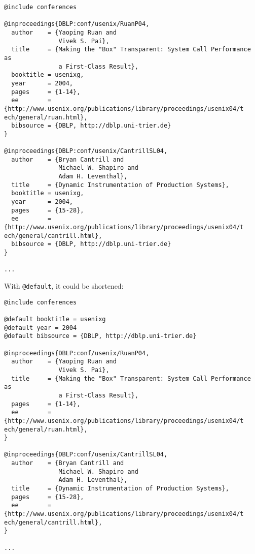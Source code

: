 \documentclass{article}
\begin{document}
\begin{small}\begin{verbatim}
@include conferences

@inproceedings{DBLP:conf/usenix/RuanP04,
  author    = {Yaoping Ruan and
               Vivek S. Pai},
  title     = {Making the "Box" Transparent: System Call Performance as
               a First-Class Result},
  booktitle = usenixg,
  year      = 2004,
  pages     = {1-14},
  ee        = {http://www.usenix.org/publications/library/proceedings/usenix04/t
ech/general/ruan.html},
  bibsource = {DBLP, http://dblp.uni-trier.de}
}

@inproceedings{DBLP:conf/usenix/CantrillSL04,
  author    = {Bryan Cantrill and
               Michael W. Shapiro and
               Adam H. Leventhal},
  title     = {Dynamic Instrumentation of Production Systems},
  booktitle = usenixg,
  year      = 2004,
  pages     = {15-28},
  ee        = {http://www.usenix.org/publications/library/proceedings/usenix04/t
ech/general/cantrill.html},
  bibsource = {DBLP, http://dblp.uni-trier.de}
}

...
\end{verbatim}\end{small}

With \texttt{@default}, it could be shortened:

\begin{small}\begin{verbatim}
@include conferences

@default booktitle = usenixg
@default year = 2004
@default bibsource = {DBLP, http://dblp.uni-trier.de}

@inproceedings{DBLP:conf/usenix/RuanP04,
  author    = {Yaoping Ruan and
               Vivek S. Pai},
  title     = {Making the "Box" Transparent: System Call Performance as
               a First-Class Result},
  pages     = {1-14},
  ee        = {http://www.usenix.org/publications/library/proceedings/usenix04/t
ech/general/ruan.html},
}

@inproceedings{DBLP:conf/usenix/CantrillSL04,
  author    = {Bryan Cantrill and
               Michael W. Shapiro and
               Adam H. Leventhal},
  title     = {Dynamic Instrumentation of Production Systems},
  pages     = {15-28},
  ee        = {http://www.usenix.org/publications/library/proceedings/usenix04/t
ech/general/cantrill.html},
}

...
\end{verbatim}\end{small}
\end{document}
